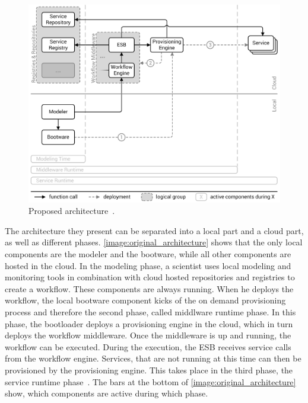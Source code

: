 \begin{figure}[!htbp]
	\centering
	\includegraphics[resolution=600]{related/assets/original_architecture}
	\caption{Proposed architecture~\autocite[based on][]{provisioning:ondemand}.}
	\label{image:original_architecture}
\end{figure}

The architecture they present can be separated into a local part and a cloud part, as well as different phases.
\autoref{image:original_architecture} shows that the only local components are the modeler and the bootware, while all other components are hosted in the cloud.
In the modeling phase, a scientist uses local modeling and monitoring tools in combination with cloud hosted repositories and registries to create a workflow.
These components are always running.
When he deploys the workflow, the local bootware component kicks of the on demand provisioning process and therefore the second phase, called middlware runtime phase.
In this phase, the bootloader deploys a provisioning engine in the cloud, which in turn deploys the workflow middleware.
Once the middleware is up and running, the workflow can be executed. During the execution, the ESB receives service calls from the workflow engine.
Services, that are not running at this time can then be provisioned by the provisioning engine.
This takes place in the third phase, the service runtime phase~\autocite{provisioning:ondemand}.
The bars at the bottom of \autoref{image:original_architecture} show, which components are active during which phase.
